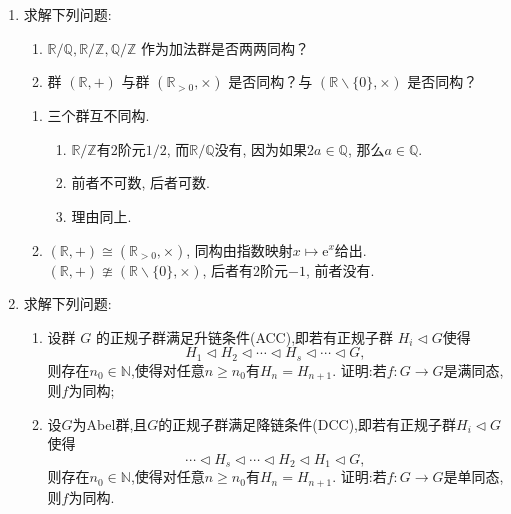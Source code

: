\begin{enumerate}
\begin{enumerate}[label=(\arabic*)]
\begin{solution}
\begin{itemize}
    \end{itemize}
    故 $\psi$ 是群同构. 
\end{solution}
\end{enumerate}
\item 求解下列问题:
\begin{enumerate}[label=(\arabic*)]
\item $\mathbb{R} / \mathbb{Q}, \mathbb{R} / \mathbb{Z}, \mathbb{Q} / \mathbb{Z}$ 作为加法群是否两两同构？
\item 群 $(\mathbb{R},+)$ 与群 $\left(\mathbb{R}_{>0}, \times\right)$ 是否同构？与 $(\mathbb{R} \backslash\{0\}, \times)$ 是否同构？
\end{enumerate}
\begin{solution}
\begin{enumerate}[label=(\arabic*)]
 	\item 三个群互不同构.
 	\begin{enumerate}
 	\item[$\mathbb{R} / \mathbb{Q}\ncong \mathbb{R} / \mathbb{Z}$] $\mathbb{R} / \mathbb{Z}$有$2$阶元$1/2$,
 	而$\mathbb{R} / \mathbb{Q}$没有, 因为如果$2a\in\mathbb{Q}$, 那么$a\in\mathbb{Q}$.
 	\item[$\mathbb{R} / \mathbb{Q}\ncong \mathbb{Q} / \mathbb{Z}$] 前者不可数, 后者可数.
 	\item[$\mathbb{R} / \mathbb{Z}\ncong \mathbb{Q} / \mathbb{Z}$] 理由同上.
 	\end{enumerate}
 	\item $(\mathbb{R},+) \cong \left(\mathbb{R}_{>0}, \times\right)$, 同构由指数映射$x \mapsto \mathrm{e}^{x}$给出.
 	$(\mathbb{R},+) \ncong (\mathbb{R} \backslash\{0\}, \times)$, 后者有$2$阶元$-1$, 前者没有.\qedhere
\end{enumerate}
\end{solution}
\item 求解下列问题:
\begin{enumerate}[label=(\arabic*)]
\item 设群 $G$ 的正规子群满足升链条件(ACC),即若有正规子群 $H_i \triangleleft G$使得
\[H_1 \triangleleft H_2 \triangleleft \cdots \triangleleft H_s \triangleleft \cdots \triangleleft G,\]
则存在$n_0 \in \mathbb{N}$,使得对任意$n \geqslant n_0$有$H_n = H_{n+1}$. 证明:若$f: G \rightarrow G$是满同态,则$f$为同构;
\item 设$G$为Abel群,且$G$的正规子群满足降链条件(DCC),即若有正规子群$H_i \triangleleft G$使得
\[\cdots \triangleleft H_s \triangleleft \cdots \triangleleft H_2 \triangleleft H_1 \triangleleft G,\]
则存在$n_0 \in \mathbb{N}$,使得对任意$n \geqslant n_0$有$H_n = H_{n+1}$. 证明:若$f: G \rightarrow G$是单同态,则$f$为同构.

\end{enumerate}
\end{enumerate}

